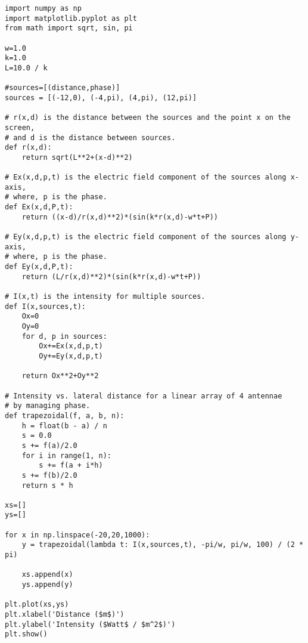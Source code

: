 \begin{Verbatim}[fontsize=\small,baselinestretch=0.9]
import numpy as np
import matplotlib.pyplot as plt
from math import sqrt, sin, pi

w=1.0
k=1.0
L=10.0 / k

#sources=[(distance,phase)]
sources = [(-12,0), (-4,pi), (4,pi), (12,pi)]

# r(x,d) is the distance between the sources and the point x on the screen,
# and d is the distance between sources.
def r(x,d):
    return sqrt(L**2+(x-d)**2)
    
# Ex(x,d,p,t) is the electric field component of the sources along x-axis,
# where, p is the phase.
def Ex(x,d,P,t):
    return ((x-d)/r(x,d)**2)*(sin(k*r(x,d)-w*t+P))
   
# Ey(x,d,p,t) is the electric field component of the sources along y-axis,
# where, p is the phase.
def Ey(x,d,P,t):
    return (L/r(x,d)**2)*(sin(k*r(x,d)-w*t+P))
 
# I(x,t) is the intensity for multiple sources.
def I(x,sources,t):
    Ox=0
    Oy=0
    for d, p in sources:
        Ox+=Ex(x,d,p,t)
        Oy+=Ey(x,d,p,t)
    
    return Ox**2+Oy**2
        
# Intensity vs. lateral distance for a linear array of 4 antennae
# by managing phase.
def trapezoidal(f, a, b, n):
    h = float(b - a) / n
    s = 0.0
    s += f(a)/2.0
    for i in range(1, n):
        s += f(a + i*h)
    s += f(b)/2.0
    return s * h

xs=[]
ys=[]

for x in np.linspace(-20,20,1000):
    y = trapezoidal(lambda t: I(x,sources,t), -pi/w, pi/w, 100) / (2 * pi)
   
    xs.append(x)
    ys.append(y)

plt.plot(xs,ys)
plt.xlabel('Distance ($m$)')
plt.ylabel('Intensity ($Watt$ / $m^2$)')
plt.show()
\end{Verbatim}
